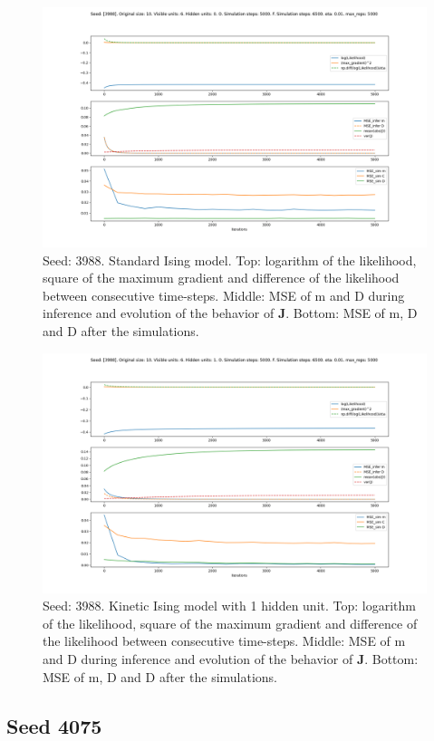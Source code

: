 \documentclass{article}
\def\*#1{\mathbf{#1}}
\begin{document}
\begin{figure}[!htb]
    \centering
    \includegraphics[width=0.7\linewidth]{images/sqrt_size/[3988]_10_6_0_5000_6500_eta001_5000_100.png}
\caption{Seed: 3988. Standard Ising model. Top: logarithm of the likelihood, square of the maximum gradient and difference of the likelihood between consecutive time-steps. Middle: MSE of m and D during inference and evolution of the behavior of $\*J$. Bottom: MSE of m, D and D after the simulations.}
\end{figure}


\begin{figure}[!htb]
    \centering
    \includegraphics[width=0.7\linewidth]{images/sqrt_size/[3988]_10_6_1_5000_6500_eta001_5000_100.png}
\caption{Seed: 3988. Kinetic Ising model with 1 hidden unit. Top: logarithm of the likelihood, square of the maximum gradient and difference of the likelihood between consecutive time-steps. Middle: MSE of m and D during inference and evolution of the behavior of $\*J$. Bottom: MSE of m, D and D after the simulations.}
\end{figure}





\newpage
\subsection{Seed 4075}
\end{document}
